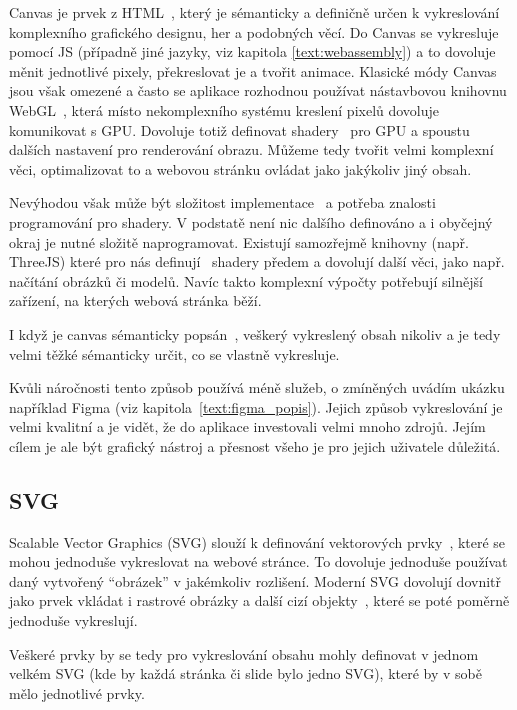 Canvas je prvek z HTML~\cite{canvashtml5, uzayr2022frontend}, který je sémanticky a definičně určen k vykreslování komplexního grafického designu, her a podobných věcí.
Do Canvas se vykresluje pomocí JS (případně jiné jazyky, viz kapitola \ref{text:webassembly}) a to dovoluje měnit jednotlivé pixely, překreslovat je a tvořit animace.
Klasické módy Canvas jsou však omezené a často se aplikace rozhodnou používat nástavbovou knihovnu WebGL~\cite{canvashtml5}, která místo nekomplexního systému kreslení pixelů dovoluje komunikovat s GPU.
Dovoluje totiž definovat shadery~\cite{canvashtml5} pro GPU a spoustu dalších nastavení pro renderování obrazu.
Můžeme tedy tvořit velmi komplexní věci, optimalizovat to a webovou stránku ovládat jako jakýkoliv jiný obsah. 

Nevýhodou však může být složitost implementace~\cite{canvashtml5} a potřeba znalosti programování pro shadery.
V podstatě není nic dalšího definováno a i obyčejný okraj je nutné složitě naprogramovat.
Existují samozřejmě knihovny (např. ThreeJS) které pro nás definují~\cite{canvashtml5} shadery předem a dovolují další věci, jako např. načítání obrázků či modelů.
Navíc takto komplexní výpočty potřebují silnější zařízení, na kterých webová stránka běží.

I když je canvas sémanticky popsán~\cite{canvashtml5}, veškerý vykreslený obsah nikoliv a je tedy velmi těžké sémanticky určit, co se vlastně vykresluje.

Kvůli náročnosti tento způsob používá méně služeb, o zmíněných uvádím ukázku například Figma (viz kapitola~\ref{text:figma_popis}).
Jejich způsob vykreslování je velmi kvalitní a je vidět, že do aplikace investovali velmi mnoho zdrojů.
Jejím cílem je ale být grafický nástroj a přesnost všeho je pro jejich uživatele důležitá.

\subsection{SVG}

Scalable Vector Graphics (SVG) slouží k definování vektorových prvky~\cite{svg_css_html}, které se mohou jednoduše vykreslovat na webové stránce.
To dovoluje jednoduše používat daný vytvořený \enquote{obrázek} v jakémkoliv rozlišení.
Moderní SVG dovolují dovnitř jako prvek vkládat i rastrové obrázky a další cizí objekty~\cite{svg_css_html, uzayr2022frontend}, které se poté poměrně jednoduše vykreslují.

Veškeré prvky by se tedy pro vykreslování obsahu mohly definovat v jednom velkém SVG (kde by každá stránka či slide bylo jedno SVG), které by v sobě mělo jednotlivé prvky.

